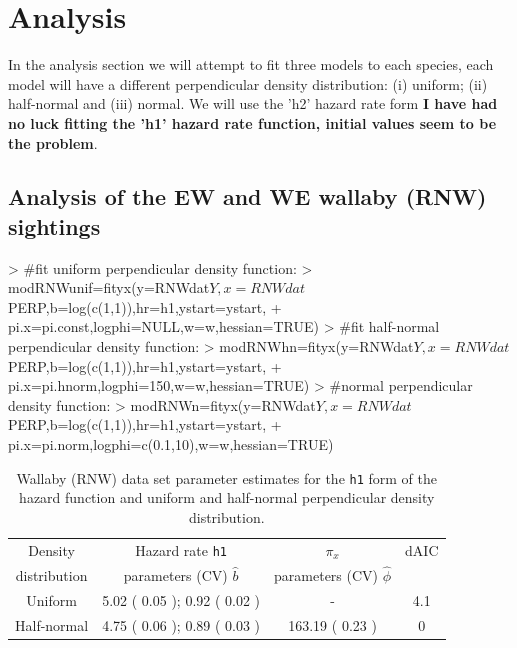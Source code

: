 \documentclass{article}
\begin{document}
\section{Analysis}
In the analysis section we will attempt to fit three models to each species, each model will have a different perpendicular density distribution: (i) uniform; (ii) half-normal and (iii) normal.  We will use the 'h2' hazard rate form \textbf{I have had no luck fitting the 'h1' hazard rate function, initial values seem to be the problem}.
\subsection{Analysis of the EW and WE wallaby (RNW) sightings}
\begin{Schunk}
\begin{Sinput}
> #fit uniform perpendicular density function:
> modRNWunif=fityx(y=RNWdat$Y,x=RNWdat$PERP,b=log(c(1,1)),hr=h1,ystart=ystart,
+                  pi.x=pi.const,logphi=NULL,w=w,hessian=TRUE)
> #fit half-normal perpendicular density function:
> modRNWhn=fityx(y=RNWdat$Y,x=RNWdat$PERP,b=log(c(1,1)),hr=h1,ystart=ystart,
+                  pi.x=pi.hnorm,logphi=150,w=w,hessian=TRUE)
> #normal perpendicular density function:
> modRNWn=fityx(y=RNWdat$Y,x=RNWdat$PERP,b=log(c(1,1)),hr=h1,ystart=ystart,
+                  pi.x=pi.norm,logphi=c(0.1,10),w=w,hessian=TRUE)
\end{Sinput}
\end{Schunk}
\begin{table}[h!]
\caption{Wallaby (RNW) data set parameter estimates for the \texttt{h1} form of the hazard function and uniform and half-normal perpendicular density distribution.}\label{tab:one}
\begin{tabular} {c | c | c | c}
Density  & Hazard rate \texttt{h1}& $\pi_x$ & dAIC \\
distribution & parameters (CV) $\hat{b}$ & parameters (CV) $\hat{\phi}$ &  \\
\hline
Uniform & 5.02 ( 0.05 ); 0.92 ( 0.02 ) & - & 4.1\\
  
Half-normal & 4.75 ( 0.06 ); 0.89 ( 0.03 ) & 163.19 ( 0.23 )
& 0\\
\end{tabular}
\end{table}
\clearpage
\end{document}
